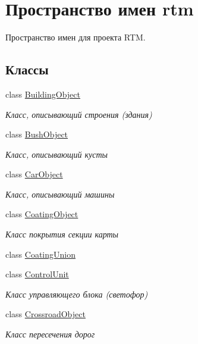 \hypertarget{namespacertm}{}\section{Пространство имен rtm}
\label{namespacertm}


Пространство имен для проекта R\+TM.  


\subsection*{Классы}
\begin{DoxyCompactItemize}
\item 
class \hyperlink{classrtm_1_1_building_object}{Building\+Object}
\begin{DoxyCompactList}\small\item\em Класс, описывающий строения (здания) \end{DoxyCompactList}\item 
class \hyperlink{classrtm_1_1_bush_object}{Bush\+Object}
\begin{DoxyCompactList}\small\item\em Класс, описывающий кусты \end{DoxyCompactList}\item 
class \hyperlink{classrtm_1_1_car_object}{Car\+Object}
\begin{DoxyCompactList}\small\item\em Класс, описывающий машины \end{DoxyCompactList}\item 
class \hyperlink{classrtm_1_1_coating_object}{Coating\+Object}
\begin{DoxyCompactList}\small\item\em Класс покрытия секции карты \end{DoxyCompactList}\item 
class \hyperlink{classrtm_1_1_coating_union}{Coating\+Union}
\item 
class \hyperlink{classrtm_1_1_control_unit}{Control\+Unit}
\begin{DoxyCompactList}\small\item\em Класс управляющего блока (светофор) \end{DoxyCompactList}\item 
class \hyperlink{classrtm_1_1_crossroad_object}{Crossroad\+Object}
\begin{DoxyCompactList}\small\item\em Класс пересечения дорог \end{DoxyCompactList}\item 

\end{DoxyCompactItemize}
